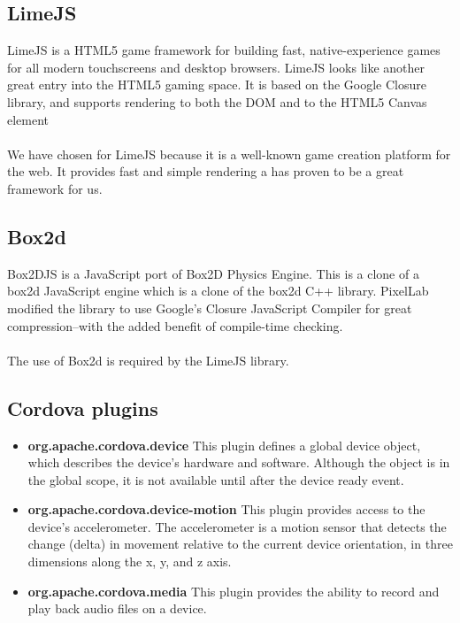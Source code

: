 \subsection{LimeJS}
\label{subsec:limejs}

LimeJS is a HTML5 game framework for building fast, native-experience games for all modern touchscreens and 
desktop browsers.
LimeJS looks like another great entry into the HTML5 gaming space.  It is based on the Google Closure library, and supports rendering to both the DOM and to the HTML5 Canvas element
\\\\
We have chosen for LimeJS because it is a well-known game creation platform for the web. It provides fast and simple rendering a has proven to be a great framework for us.

\subsection{Box2d}

Box2DJS is a JavaScript port of Box2D Physics Engine.
This is a clone of a box2d JavaScript engine which is a clone of the box2d C++ library.
PixelLab modified the library to use Google's Closure JavaScript Compiler for great compression--with the added benefit of compile-time checking.
\\\\
The use of Box2d is required by the LimeJS library.


\subsection{Cordova plugins}
\label{subsec:cordova-plugins}

\begin{itemize}
  \item \textbf{org.apache.cordova.device}
  This plugin defines a global device object, which describes the device's hardware and software. Although the object is in the global scope, it     is not available until after the device ready event.
  
  \item \textbf{org.apache.cordova.device-motion}
    This plugin provides access to the device's accelerometer. The accelerometer is a motion sensor that detects the change (delta) in movement        relative to the current device orientation, in three dimensions along the x, y, and z axis.
  \item \textbf{ org.apache.cordova.media}
    This plugin provides the ability to record and play back audio files on a device.

\end{itemize}



